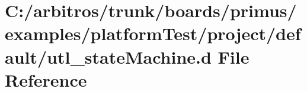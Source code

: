 \hypertarget{boards_2primus_2examples_2platform_test_2project_2default_2utl__state_machine_8d}{\section{C\-:/arbitros/trunk/boards/primus/examples/platform\-Test/project/default/utl\-\_\-state\-Machine.d File Reference}
\label{boards_2primus_2examples_2platform_test_2project_2default_2utl__state_machine_8d}
}
